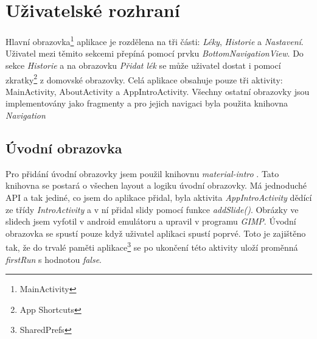 \documentclass[a4paper,12pt]{report}
\begin{document}
\section{Uživatelské rozhraní}

Hlavní obrazovka\footnote{MainActivity} aplikace je rozdělena na tři části: \emph{Léky}, \emph{Historie} a \emph{Nastavení}. Uživatel mezi těmito sekcemi přepíná pomocí prvku \emph{BottomNavigationView}. Do sekce \emph{Historie} a na obrazovku \emph{Přidat lék} se může uživatel dostat i pomocí zkratky\footnote{App Shortcuts} z domovské obrazovky. Celá aplikace obsahuje pouze tři aktivity: MainActivity, AboutActivity a AppIntroActivity. Všechny ostatní obrazovky jsou implementovány jako fragmenty a pro jejich navigaci byla použita knihovna \emph{Navigation} \cite{navigation}

\subsection{Úvodní obrazovka}

Pro přidání úvodní obrazovky jsem použil knihovnu \emph{material-intro} \cite{intro}. Tato knihovna se postará o všechen layout a logiku úvodní obrazovky. Má jednoduché API a tak jediné, co jsem do aplikace přidal, byla aktivita \emph{AppIntroActivity} dědící ze třídy \emph{IntroActivity} a v ní přidal slidy pomocí funkce \emph{addSlide()}. Obrázky ve slidech jsem vyfotil v android emulátoru a upravil v programu \emph{GIMP}. Úvodní obrazovka se spustí pouze když uživatel aplikaci spustí poprvé. Toto je zajištěno tak, že do trvalé paměti aplikace\footnote{SharedPrefs} se po ukončení této aktivity uloží proměnná \emph{firstRun} s hodnotou \emph{false}.
\end{document}
